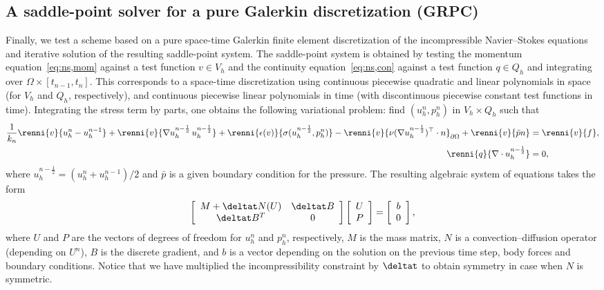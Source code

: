 \subsection{A saddle-point solver for a pure Galerkin discretization (GRPC)}

Finally, we test a scheme based on a pure space-time Galerkin finite
element discretization of the incompressible Navier--Stokes equations
and iterative solution of the resulting saddle-point system. The
saddle-point system is obtained by testing the momentum
equation~\eqref{eq:ns,mom} against a test function $v \in V_h$ and the
continuity equation~\eqref{eq:ns,con} against a test function $q \in
Q_h$ and integrating over $\Omega \times [t_{n-1}, t_n]$. This
corresponds to a space-time discretization using continuous piecewise
quadratic and linear polynomials in space (for $V_h$ and $Q_h$,
respectively), and continuous piecewise linear polynomials in time
(with discontinuous piecewise constant test functions in
time). Integrating the stress term by parts, one obtains the following
variational problem: find $(u^n_h, p^n_h)$ in $V_h \times Q_h$ such
that
\begin{align}
    \frac{1}{k_n} \renni{v}{u^n_h - u^{n-1}_h}
    + \renni{v}{\nabla u^{n-\frac{1}{2}}_h \, u^{n-\frac{1}{2}}_h}
    + \renni{\epsilon(v)}{\sigma(u^{n-\frac{1}{2}}_h, p^n_h)}
    - \renni{v}{\nu (\nabla u^{n-\frac{1}{2}}_h)^{\top} \cdot n}_{\partial \Omega}
    + \renni{v}{\bar{p}n} &= \renni{v}{f}, \\
    \renni{q}{\nabla \cdot u^{n-\frac{1}{2}}_h} &= 0,
\end{align}
where $u^{n-\frac{1}{2}}_h = ({u}^n_h + {u}^{n-1}_h) / 2$ and $\bar{p}$ is a
given boundary condition for the pressure. The resulting algebraic
system of equations takes the form
\begin{equation}
\left[
\begin{array}{cc}
M + \deltat N(U) & \deltat B \\
\deltat B^T & 0
\end{array}
\right]
\left[
\begin{array}{c}
U \\ P
\end{array}
\right]
=
\left[
\begin{array}{c}
b\\ 0
\end{array}
\right],
\label{timestepping}
\end{equation}
where $U$ and $P$ are the vectors of degrees of freedom for $u^n_h$
and $p^n_h$, respectively, $M$ is the mass matrix, $N$ is a
convection--diffusion operator (depending on $U^n$), $B$ is the
discrete gradient, and $b$ is a vector depending on the solution on
the previous time step, body forces and boundary conditions. Notice
that we have multiplied the incompressibility constraint by $\deltat$
to obtain symmetry in case when $N$ is symmetric.

